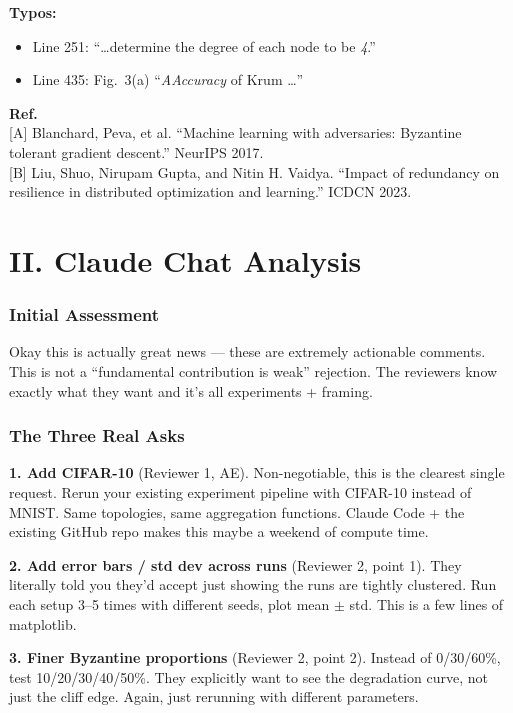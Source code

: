 \documentclass[11pt]{article}
\begin{document}
\begin{reviewquote}
\medskip
\textbf{Typos:}
\begin{itemize}[nosep]
  \item Line 251: ``\ldots determine the degree of each node to be \textit{4}.''
  \item Line 435: Fig.~3(a) ``\textit{AAccuracy} of Krum \ldots''
\end{itemize}

\medskip
\textbf{Ref.}\\
{[A]} Blanchard, Peva, et al. ``Machine learning with adversaries: Byzantine tolerant gradient descent.'' NeurIPS 2017.\\
{[B]} Liu, Shuo, Nirupam Gupta, and Nitin H. Vaidya. ``Impact of redundancy on resilience in distributed optimization and learning.'' ICDCN 2023.
\end{reviewquote}

\newpage
\part*{II. Claude Chat Analysis}

\section{Initial Assessment}

\begin{chatquote}
Okay this is actually great news --- these are extremely actionable comments. This is not a ``fundamental contribution is weak'' rejection. The reviewers know exactly what they want and it's all experiments + framing.
\end{chatquote}

\section{The Three Real Asks}

\begin{chatquote}
\textbf{1. Add CIFAR-10} (Reviewer 1, AE). Non-negotiable, this is the clearest single request. Rerun your existing experiment pipeline with CIFAR-10 instead of MNIST. Same topologies, same aggregation functions. Claude Code + the existing GitHub repo makes this maybe a weekend of compute time.

\medskip
\textbf{2. Add error bars / std dev across runs} (Reviewer 2, point 1). They literally told you they'd accept just showing the runs are tightly clustered. Run each setup 3--5 times with different seeds, plot mean $\pm$ std. This is a few lines of matplotlib.

\medskip
\textbf{3. Finer Byzantine proportions} (Reviewer 2, point 2). Instead of 0/30/60\%, test 10/20/30/40/50\%. They explicitly want to see the degradation curve, not just the cliff edge. Again, just rerunning with different parameters.
\end{chatquote}
\end{document}
